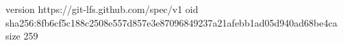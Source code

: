 version https://git-lfs.github.com/spec/v1
oid sha256:8fb6cf5c188c2508e557d857e3e87096849237a21afebb1ad05d940ad68be4ca
size 259
